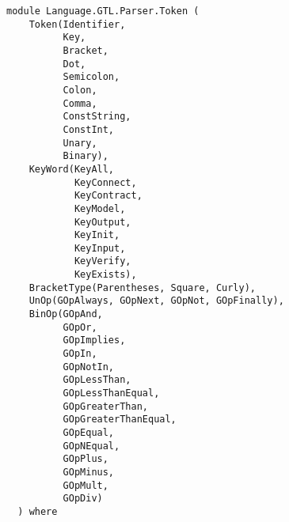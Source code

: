 \label{module:Language.GTL.Parser.Token}
\haddockbeginheader
{\haddockverb\begin{verbatim}
module Language.GTL.Parser.Token (
    Token(Identifier,
          Key,
          Bracket,
          Dot,
          Semicolon,
          Colon,
          Comma,
          ConstString,
          ConstInt,
          Unary,
          Binary), 
    KeyWord(KeyAll,
            KeyConnect,
            KeyContract,
            KeyModel,
            KeyOutput,
            KeyInit,
            KeyInput,
            KeyVerify,
            KeyExists), 
    BracketType(Parentheses, Square, Curly), 
    UnOp(GOpAlways, GOpNext, GOpNot, GOpFinally), 
    BinOp(GOpAnd,
          GOpOr,
          GOpImplies,
          GOpIn,
          GOpNotIn,
          GOpLessThan,
          GOpLessThanEqual,
          GOpGreaterThan,
          GOpGreaterThanEqual,
          GOpEqual,
          GOpNEqual,
          GOpPlus,
          GOpMinus,
          GOpMult,
          GOpDiv)
  ) where\end{verbatim}}
\haddockendheader

